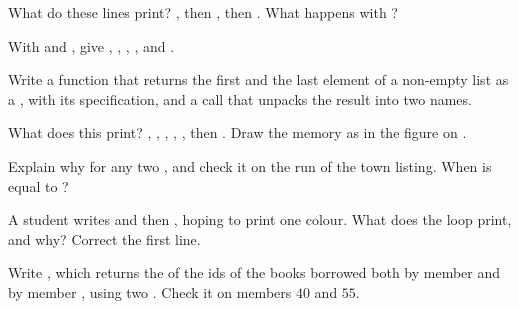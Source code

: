 \begin{exercise}[$\star$]\label{exo:g10:tuples-sets-comprehensions:1}
What do these lines print? , then , then . What
happens with ?
\end{exercise}

\begin{exercise}[$\star$]\label{exo:g10:tuples-sets-comprehensions:2}
With  and , give , , ,
,  and .
\end{exercise}

\begin{exercise}[$\star$]\label{exo:g10:tuples-sets-comprehensions:3}
Write a function  that returns the first and the last element of a non-empty list as a ,
with its specification, and a call that unpacks the result into two names.
\end{exercise}

\begin{exercise}[$\star$]\label{exo:g10:tuples-sets-comprehensions:4}
What does this print? , , , , ,
then . Draw the memory as in the figure on .
\end{exercise}

\begin{exercise}[$\star$]\label{exo:g10:tuples-sets-comprehensions:5}
Explain why  for any two , and check it on the run of the
town listing. When is  equal to ?
\end{exercise}

\begin{exercise}[$\star\star$]\label{exo:g10:tuples-sets-comprehensions:6}
A student writes  and then , hoping to print one colour.
What does the loop print, and why? Correct the first line.
\end{exercise}

\begin{exercise}[$\star\star$]\label{exo:g10:tuples-sets-comprehensions:7}
Write , which returns the  of the ids of the books borrowed both by member
 and by member , using two  . Check it on members $40$ and $55$.
\end{exercise}

